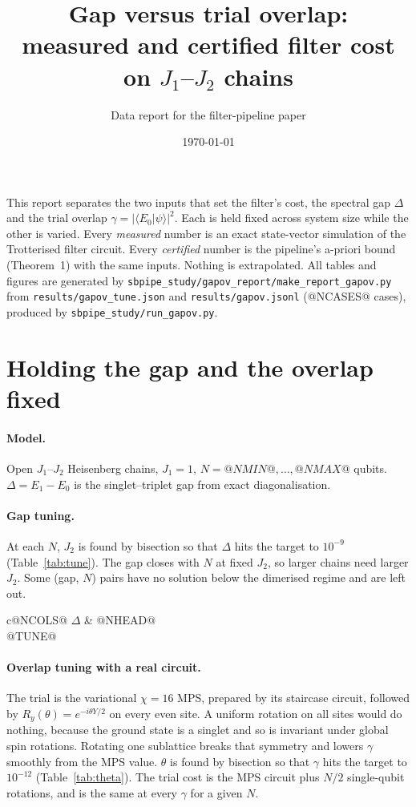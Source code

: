 \documentclass[10pt]{article}
\title{Gap versus trial overlap:\\ measured and certified filter cost on $J_1$--$J_2$ chains}
\author{Data report for the filter-pipeline paper}
\date{\today}
\begin{document}
\maketitle

\noindent This report separates the two inputs that set the filter's cost, the spectral gap $\Delta$ and the trial
overlap $\gamma=|\langle E_0|\psi\rangle|^2$. Each is held fixed across system size while the other is varied.
Every \emph{measured} number is an exact state-vector simulation of the Trotterised filter circuit. Every
\emph{certified} number is the pipeline's a-priori bound (Theorem~1) with the same inputs. Nothing is
extrapolated. All tables and figures are generated by \texttt{sbpipe\_study/gapov\_report/make\_report\_gapov.py}
from \texttt{results/gapov\_tune.json} and \texttt{results/gapov.jsonl} (@NCASES@ cases), produced by
\texttt{sbpipe\_study/run\_gapov.py}.

\section{Holding the gap and the overlap fixed}

\paragraph{Model.} Open $J_1$--$J_2$ Heisenberg chains, $J_1=1$, $N=@NMIN@,\dots,@NMAX@$ qubits.
$\Delta=E_1-E_0$ is the singlet--triplet gap from exact diagonalisation.

\paragraph{Gap tuning.} At each $N$, $J_2$ is found by bisection so that $\Delta$ hits the target to $10^{-9}$
(Table~\ref{tab:tune}). The gap closes with $N$ at fixed $J_2$, so larger chains need larger $J_2$. Some
(gap, $N$) pairs have no solution below the dimerised regime and are left out.

\begin{table}[h]\centering\small
\caption{$J_2$ that gives each target gap $\Delta$ at each $N$ (``--'': not reachable).}\label{tab:tune}
\begin{tabular}{c@NCOLS@}\toprule
$\Delta$ & @NHEAD@ \\\midrule
@TUNE@
\bottomrule\end{tabular}
\end{table}

\paragraph{Overlap tuning with a real circuit.} The trial is the variational $\chi=16$ MPS, prepared by its
staircase circuit, followed by $R_y(\theta)=e^{-i\theta Y/2}$ on every even site. A uniform rotation on all sites
would do nothing, because the ground state is a singlet and so is invariant under global spin rotations. Rotating
one sublattice breaks that symmetry and lowers $\gamma$ smoothly from the MPS value. $\theta$ is found by
bisection so that $\gamma$ hits the target to $10^{-12}$ (Table~\ref{tab:theta}). The trial cost is the MPS circuit
plus $N/2$ single-qubit rotations, and is the same at every $\gamma$ for a given $N$.
\end{document}

